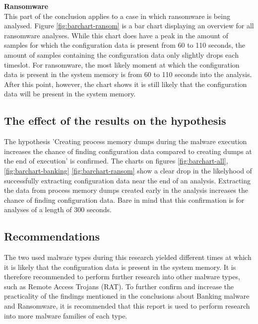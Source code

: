 \documentclass[conference]{IEEEtran}
\begin{document}
\textbf{Ransomware}\\
This part of the conclusion applies to a case in which ransomware is being analysed. Figure \ref{fig:barchart-ransom} is a bar chart displaying an overview for all ransomware analyses. While this chart does have a peak in the amount of samples for which the \Gls{configuration data} is present from 60 to 110 seconds, the amount of samples containing the \Gls{configuration data} only slightly drops each timeslot. For ransomware, the most likely moment at which the \Gls{configuration data} is present in the system memory is from 60 to 110 seconds into the analysis. After this point, however, the chart shows it is still likely that the \Gls{configuration data} will be present in the system memory.

\subsection{The effect of the results on the hypothesis}
The hypothesis 'Creating process memory dumps during the malware execution increases the chance of finding \Gls{configuration data} compared to creating dumps at the end of execution' is confirmed. The charts on figures \ref{fig:barchart-all}, \ref{fig:barchart-banking} \ref{fig:barchart-ransom} show a clear drop in the likelyhood of successfully extracting \Gls{configuration data} near the end of an analysis. Extracting the data from process memory dumps created early in the analysis increases the chance of finding \Gls{configuration data}. Bare in mind that this confirmation is for analyses of a length of 300 seconds.

\subsection{Recommendations}
The two used malware types during this research yielded different times at which it is likely that the \Gls{configuration data} is present in the system memory. It is therefore recommended to perform further research into other malware types, such as Remote Access Trojans (RAT). To further confirm and increase the practicality of the findings mentioned in the conclusions about Banking malware and Ransomware, it is recommended that this report is used to perform research into more malware families of each type.
\end{document}

